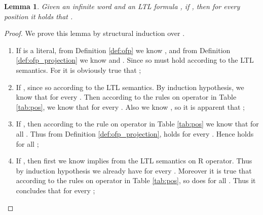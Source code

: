 \documentclass[conference]{IEEEtran}
\newtheorem{lemma}{Lemma}
\newtheorem{proof}{IEEEproof}
\begin{document}
\begin{lemma}\label{lem:reduction_3}
    Given an infinite word  and an LTL formula , if , then 
    for every position  it holds that .
\end{lemma}
\begin{proof}
  We prove this lemma by structural induction over . 
  \iffalse
  The proof is trivial for 
  the cases when the type of  is the 
  literal, next, until, release, or  formula, so we here focus on the cases when 
  it is Global (G) and :
  \fi
  \begin{enumerate}
  
    \item If  is a literal, from Definition \ref{def:ofp} we know 
    , and from Definition \ref{def:ofp_projection} 
    we know  and 
    . Since  so  must 
    hold according to the LTL semantics. For  it is obviously true that 
    ; 
    
    \item If , since  so  according to the 
    LTL semantics. By induction hypothesis, we know that  
    for every . Then according to the  rules on  operator in Table \ref{tab:pos}, we 
    know that  for every . Also we know 
    , so it is apparent that ;
    
    \item If , then according to the  rule on  operator in Table 
    \ref{tab:pos} we know that  for all . Thus from Definition 
    \ref{def:ofp_projection},  holds 
    for every . Hence  holds for all ;
    
    \item If , then first we know  implies 
     from the LTL semantics on R operator. Thus by induction hypothesis we already 
    have  for every . Moreover it is true that 
     according to the  rules on  operator in Table \ref{tab:pos}, so 
    does  for all . Thus it concludes that 
     for every ;
    

\end{enumerate}
\end{proof}
\end{document}
